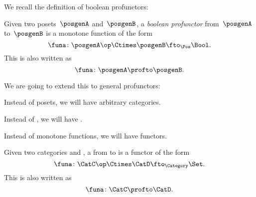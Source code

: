 We recall the definition of boolean profunctors:

\begin{ctdefinition}
    \label{def:boolean-profunctor-again}
    Given two posets~$\posgenA$ and~$\posgenB$, a \emph{boolean profunctor} from~$\posgenA$ to~$\posgenB$ is a monotone function of the form
    \begin{equation}
        \label{eq:boolean-profunctor-funa}
        \funa\colon \posgenA\op \Ctimes \posgenB \fto_{\Pos} \Bool.
    \end{equation}
    This is also written as
    \begin{equation}
        \funa\colon \posgenA \profto \posgenB.
    \end{equation}
\end{ctdefinition}

We are going to extend this to general profunctors:
\begin{compactitem}
    \item Instead of posets, we will have arbitrary categories.
    \item Instead of \Bool, we will have \Set.
    \item Instead of monotone functions, we will have functors.
\end{compactitem}

\begin{ctdefinition}[Profunctors]
    \label{def:profunctor}
    Given two categories \CatC and \CatD, a \emph{} from \CatC to \CatD is a functor of the form
    \begin{equation}
        \label{eq:profunctors-def-1}
        \funa\colon \CatC\op \Ctimes \CatD \fto_{\Category} \Set.
    \end{equation}
    This is also written as
    \begin{equation}
        \label{eq:profunctors-def-2}
        \funa\colon \CatC \profto \CatD.
    \end{equation}
\end{ctdefinition}


